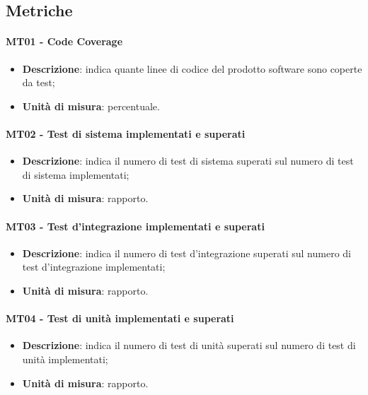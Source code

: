     \subsection{Metriche}
        \paragraph{MT01 - Code Coverage}
        \begin{itemize}
            \item \textbf{Descrizione}: indica quante linee di codice del prodotto software sono coperte da test;
            \item \textbf{Unità di misura}: percentuale.
        \end{itemize}

        \paragraph{MT02 - Test di sistema implementati e superati}
        \begin{itemize}
            \item \textbf{Descrizione}: indica il numero di test di sistema superati sul numero di test di sistema implementati;
            \item \textbf{Unità di misura}: rapporto.
        \end{itemize}

        \paragraph{MT03 - Test d'integrazione implementati e superati}
        \begin{itemize}
            \item \textbf{Descrizione}: indica il numero di test d'integrazione superati sul numero di test d'integrazione implementati;
            \item \textbf{Unità di misura}: rapporto.
        \end{itemize}

        \paragraph{MT04 - Test di unità implementati e superati}
        \begin{itemize}
            \item \textbf{Descrizione}: indica il numero di test di unità superati sul numero di test di unità implementati;
            \item \textbf{Unità di misura}: rapporto.
        \end{itemize}
